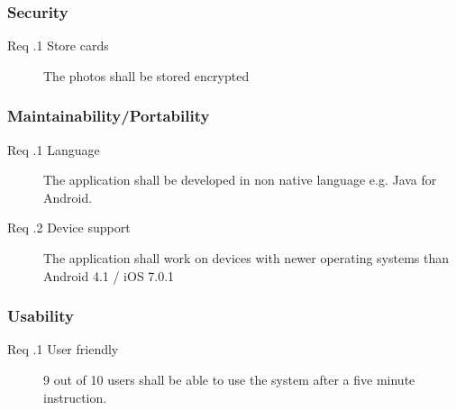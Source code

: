 \documentclass[10pt,a4paper]{article}
\newcommand{\tsss}{\thesubsubsection}
\begin{document}
\subsubsection{Security}
\begin{description}
	\item[Req \tsss.1 Store cards] The photos shall be stored encrypted
\end{description}
\subsubsection{Maintainability/Portability}
\begin{description}
	\item[Req \tsss.1 Language] The application shall be developed in non native language e.g. Java for Android. 
	\item[Req \tsss.2 Device support] The application shall work on devices with newer operating systems than Android 4.1 / iOS 7.0.1
\end{description}
\subsubsection{Usability}
\begin{description}
	\item [Req \tsss.1 User friendly] 9 out of 10 users shall be able to use the system after a five minute instruction.
\end{description}






\end{document}
